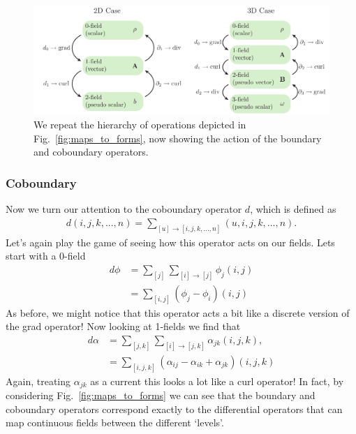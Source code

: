 \documentclass[11pt, oneside]{article} %
\numberwithin{equation}{section}
\begin{document}
\begin{figure}
    \centering
    \includegraphics[width=\linewidth]{figs/maps_to_forms_boundaries.pdf}
    \caption{We repeat the hierarchy of operations depicted in Fig.~\ref{fig:maps_to_forms}, now showing the action of the boundary and coboundary operators.}
    \label{fig:maps_to_forms_boundaries}
\end{figure}



\subsubsection{Coboundary}

Now we turn our attention to the coboundary operator $d$, which is defined as 
\begin{align}
    d(i,j,k,...,n) = \sum_{[u]\rightarrow [i,j,k,...,n]}(u,i,j,k,...,n).
\end{align}
Let's again play the game of seeing how this operator acts on our fields. Lets start with a 0-field
\begin{align}
    d\phi &= \sum_{[j]} \sum_{[i]\rightarrow [j]} \phi_j (i,j) \\
    & = \sum_{[i,j]}(\phi_j - \phi_i) (i,j)
\end{align}
As before, we might notice that this operator acts a bit like a discrete version of the grad operator! Now looking at 1-fields we find that
\begin{align}
    d\alpha &= \sum_{[j,k]} \sum_{[i]\rightarrow [j,k]} \alpha_{jk} (i,j,k), \\
    & = \sum_{[i,j,k]}(\alpha_{ij} - \alpha_{ik} + \alpha_{jk}) (i,j,k)
\end{align}
Again, treating $\alpha_{jk}$ as a current this looks a lot like a curl operator! In fact, by considering Fig.~\ref{fig:maps_to_forms} we can see that the boundary and coboundary operators correspond exactly to the differential operators that can map continuous fields between the different `levels'.
\end{document}
